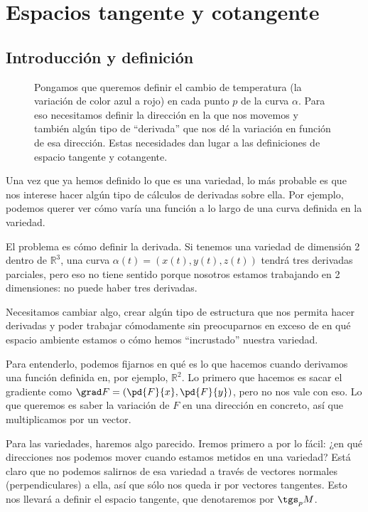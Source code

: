 \documentclass[palatino, bibnumbers]{apuntes}
\begin{document}
\chapter{Espacios tangente y cotangente}
\label{chap:EspaciosTangenteyCotangente}

\section{Introducción y definición}

\begin{figure}[hbtp]
\centering
{}
\caption{Pongamos que queremos definir el cambio de temperatura (la variación de color azul a rojo) en cada punto $p$ de la curva $α$. Para eso necesitamos definir la dirección en la que nos movemos y también algún tipo de ``derivada'' que nos dé la variación en función de esa dirección. Estas necesidades dan lugar a las definiciones de espacio tangente y cotangente.}
\end{figure}

Una vez que ya hemos definido lo que es una variedad, lo más probable es que nos interese hacer algún tipo de cálculos de derivadas sobre ella. Por ejemplo, podemos querer ver cómo varía una función a lo largo de una curva definida en la variedad.

El problema es cómo definir la derivada. Si tenemos una variedad de dimensión 2 dentro de $ℝ^3$, una curva $α(t) = (x(t), y(t), z(t))$ tendrá tres derivadas parciales, pero eso no tiene sentido porque nosotros estamos trabajando en 2 dimensiones: no puede haber tres derivadas.

Necesitamos cambiar algo, crear algún tipo de estructura que nos permita hacer derivadas y poder trabajar cómodamente sin preocuparnos en exceso de en qué espacio ambiente estamos o cómo hemos ``incrustado'' nuestra variedad.

Para entenderlo, podemos fijarnos en qué es lo que hacemos cuando derivamos una función definida en, por ejemplo, $ℝ^2$. Lo primero que hacemos es sacar el gradiente como $\grad F = \left(\pd{F}{x}, \pd{F}{y}\right)$, pero no nos vale con eso. Lo que queremos es saber la variación de $F$ en una dirección en concreto, así que multiplicamos por un vector.

Para las variedades, haremos algo parecido. Iremos primero a por lo fácil: ¿en qué direcciones nos podemos mover cuando estamos metidos en una variedad? Está claro que no podemos salirnos de esa variedad a través de vectores normales (perpendiculares) a ella, así que sólo nos queda ir por vectores tangentes. Esto nos llevará a definir el espacio tangente, que denotaremos por $\tgs_p M$.
\end{document}
